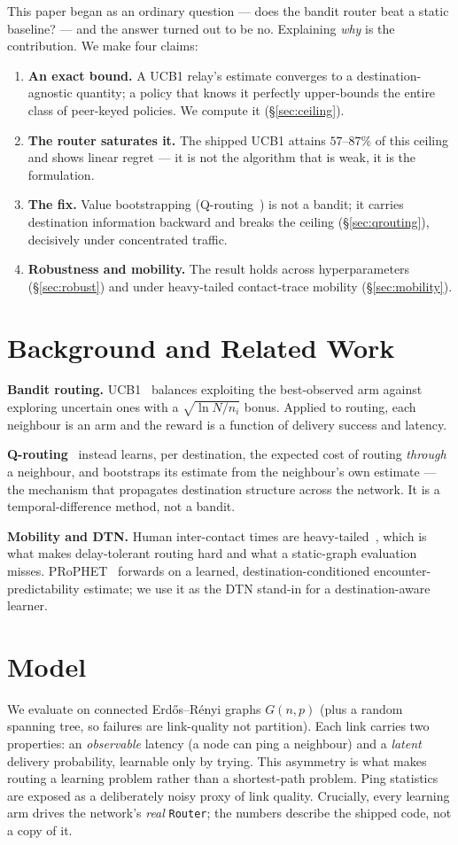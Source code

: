 \documentclass[sigconf,nonacm]{acmart}
\begin{document}
This paper began as an ordinary question --- does the bandit router beat a static
baseline? --- and the answer turned out to be no. Explaining \emph{why} is the
contribution. We make four claims:
\begin{enumerate}
\item \textbf{An exact bound.} A UCB1 relay's estimate converges to a
destination-agnostic quantity; a policy that knows it perfectly upper-bounds the
entire class of peer-keyed policies. We compute it (\S\ref{sec:ceiling}).
\item \textbf{The router saturates it.} The shipped UCB1 attains $57$--$87\%$ of
this ceiling and shows linear regret --- it is not the algorithm that is weak, it
is the formulation.
\item \textbf{The fix.} Value bootstrapping (Q-routing~\cite{boyan1994}) is not a
bandit; it carries destination information backward and breaks the ceiling
(\S\ref{sec:qrouting}), decisively under concentrated traffic.
\item \textbf{Robustness and mobility.} The result holds across hyperparameters
(\S\ref{sec:robust}) and under heavy-tailed contact-trace mobility
(\S\ref{sec:mobility}).
\end{enumerate}

\section{Background and Related Work}
\textbf{Bandit routing.} UCB1~\cite{auer2002} balances exploiting the
best-observed arm against exploring uncertain ones with a $\sqrt{\ln
N/n_i}$ bonus. Applied to routing, each neighbour is an arm and the reward is a
function of delivery success and latency.

\textbf{Q-routing}~\cite{boyan1994} instead learns, per destination, the expected
cost of routing \emph{through} a neighbour, and bootstraps its estimate from the
neighbour's own estimate --- the mechanism that propagates destination structure
across the network. It is a temporal-difference method, not a bandit.

\textbf{Mobility and DTN.} Human inter-contact times are
heavy-tailed~\cite{chaintreau2007}, which is what makes delay-tolerant routing
hard and what a static-graph evaluation misses. PRoPHET~\cite{lindgren2003}
forwards on a learned, destination-conditioned encounter-predictability estimate;
we use it as the DTN stand-in for a destination-aware learner.

\section{Model}\label{sec:model}
We evaluate on connected Erd\H{o}s--R\'enyi graphs $G(n,p)$ (plus a random
spanning tree, so failures are link-quality not partition). Each link carries two
properties: an \emph{observable} latency (a node can ping a neighbour) and a
\emph{latent} delivery probability, learnable only by trying. This asymmetry is
what makes routing a learning problem rather than a shortest-path problem. Ping
statistics are exposed as a deliberately noisy proxy of link quality. Crucially,
every learning arm drives the network's \emph{real} \texttt{Router}; the numbers
describe the shipped code, not a copy of it.
\end{document}
